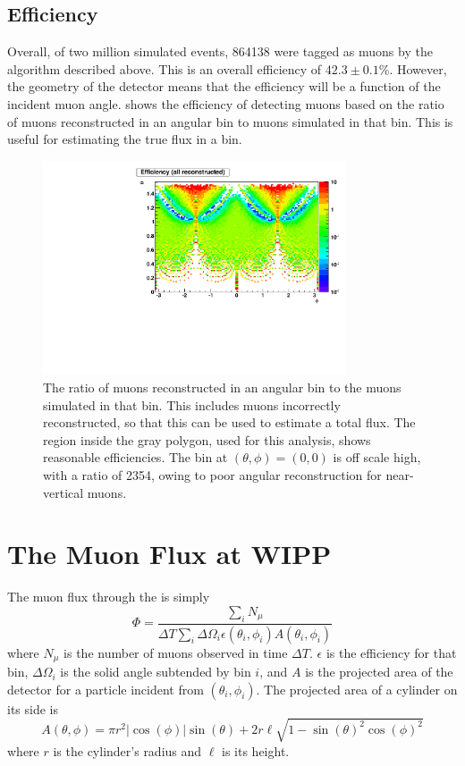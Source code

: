 \documentclass[herrin-thesis.tex]{subfiles}
\begin{document}
\subsection{Efficiency}
Overall, of two million simulated events, 864138 were tagged as muons by the algorithm described above. This is an overall efficiency of \(42.3 \pm 0.1\)\%. However, the geometry of the detector means that the efficiency will be a function of the incident muon angle.  shows the efficiency of detecting muons based on the ratio of muons reconstructed in an angular bin to muons simulated in that bin. This is useful for estimating the true flux in a bin.

 \begin{figure}[htb]
 \centering
 \includegraphics[width=0.8\textwidth]{./plots/muon_efficiency.pdf}
 \caption[Efficiency of reconstructing muons as a function of angle]{The ratio of muons reconstructed in an angular bin to the muons simulated in that bin. This includes muons incorrectly reconstructed, so that this can be used to estimate a total flux. The region inside the gray polygon, used for this analysis, shows reasonable efficiencies. The bin at \((\theta, \phi) = (0, 0)\) is off scale high, with a ratio of 2354, owing to poor angular reconstruction for near-vertical muons.}
 \label{fig:muon_efficiency}
 \end{figure}
 
\section{The Muon Flux at WIPP}
\label{sec:muon:wipp}
The muon flux through the  is simply
\begin{equation}
\label{eq:muon_fluxdef}
\Phi = \frac{\sum_{i}N_{\mu}}{ \Delta T\sum_{i}\Delta\Omega_i \epsilon(\theta_i, \phi_i) A(\theta_i, \phi_i)}
\end{equation}
where \(N_\mu\) is the number of muons observed in time \(\Delta T\). \(\epsilon\) is the efficiency for that bin, \(\Delta\Omega_i\) is the solid angle subtended by bin \(i\), and \(A\) is the projected area of the detector for a particle incident from \((\theta_i, \phi_i)\). The projected area of a cylinder on its side is
\begin{equation}
A(\theta,\phi) = \pi r^2 |\cos(\phi)|\sin(\theta) + 2 r \ell \sqrt{1-\sin(\theta)^2 \cos(\phi)^2}
\end{equation}
where \(r\) is the cylinder's radius and \(\ell\) is its height.
\end{document}
